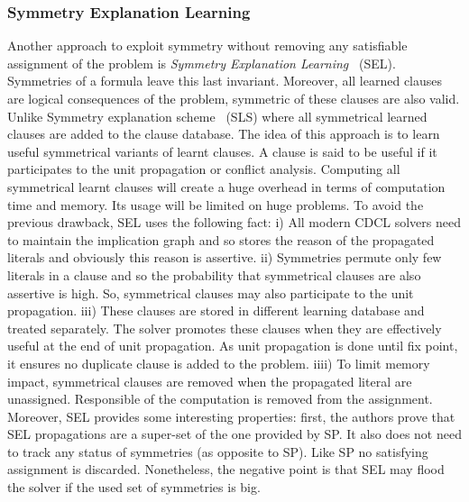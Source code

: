 \subsubsection{Symmetry Explanation Learning}

Another approach to exploit symmetry without removing any satisfiable assignment of the problem
is \emph{Symmetry Explanation Learning}~\cite{devriendt2017symmetric} (SEL). 
Symmetries of a formula leave this last invariant. Moreover, all learned clauses are logical consequences of the problem, symmetric of these clauses are also valid.
Unlike Symmetry explanation scheme~\cite{benhamou2010enhancing} (SLS) where all symmetrical learned clauses
are added to the clause database.
The idea of this approach is to learn useful symmetrical variants of learnt clauses.
 A clause is said to be useful if it participates to the unit propagation or conflict analysis.
Computing all symmetrical learnt clauses will create a huge overhead in terms of computation time and memory.
Its usage will be limited on huge problems.
To avoid the previous drawback, SEL uses the following fact:
i) All modern CDCL solvers need to maintain the implication graph and so stores the reason of the propagated literals and
obviously this reason is assertive.
ii) Symmetries permute only few literals in a clause and so the probability that symmetrical clauses are also assertive is high.
So, symmetrical clauses may also participate to the unit propagation.
iii) These clauses are stored in different learning database and 
treated separately. The solver promotes these clauses when they are effectively useful
at the end of unit propagation. As unit propagation is done until fix point, it
ensures no duplicate clause is added to the problem.
iiii) To limit memory impact, symmetrical clauses are removed when the propagated literal are unassigned.
Responsible of the computation is removed from the assignment.
Moreover, SEL provides some interesting properties:
first, the authors prove that SEL propagations are a super-set of the one provided by SP. 
It also does not need to track any status of symmetries (as opposite to SP).
Like SP no satisfying assignment is discarded.
Nonetheless, the negative point is that SEL may flood the solver if the used set of symmetries is big. 

